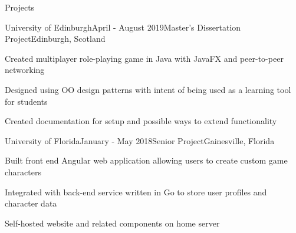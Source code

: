 \documentclass[
	11pt, %
]{resume} %
\begin{document}
\begin{rSection}{Projects}

	\begin{rSubsection}{University of Edinburgh}{April - August 2019}{Master's Dissertation Project}{Edinburgh, Scotland}
		\item Created multiplayer role-playing game in Java with JavaFX and peer-to-peer networking
		\item Designed using OO design patterns with intent of being used as a learning tool for students
		\item Created documentation for setup and possible ways to extend functionality
	\end{rSubsection}


	\begin{rSubsection}{University of Florida}{January - May 2018}{Senior Project}{Gainesville, Florida}
		\item Built front end Angular web application allowing users to create custom game characters
		\item Integrated with back-end service written in Go to store user profiles and character data
		\item Self-hosted website and related components on home server
	\end{rSubsection}

\end{rSection}
\end{document}
